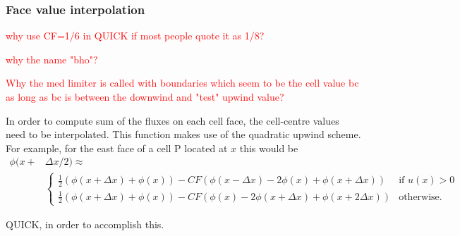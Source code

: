 \documentclass[notitlepage]{article}
\begin{document}
\subsubsection{Face value interpolation}

\textcolor{red}{why use CF=1/6 in QUICK if most people quote it as 1/8?}

\textcolor{red}{why the name "bho"?}

\textcolor{red}{Why the med limiter is called with boundaries which seem to be
	the cell value bc as long as bc is between the downwind and "test" upwind value?}

In order to compute sum of the fluxes on each cell face, the cell-centre values
need to be interpolated. This function makes use of the quadratic upwind scheme.
For example, for the east face of a cell P located at $x$ this would be
%
\begin{equation}
\begin{aligned}
\phi(x+&\Delta x/2) \approx \\
&\begin{cases}
	\frac{1}{2}(\phi(x + \Delta x) + \phi(x)) - CF (\phi(x- \Delta x) -2 \phi(x) + \phi(x+\Delta x)) & \mbox{if } u(x)>0 \\
	\frac{1}{2}(\phi(x + \Delta x) + \phi(x)) - CF (\phi(x) -2 \phi(x+\Delta x) + \phi(x+2\Delta x)) & \mbox{otherwise.}
\end{cases} 
\end{aligned}
\end{equation}

QUICK, in order to accomplish this. 
\end{document}
